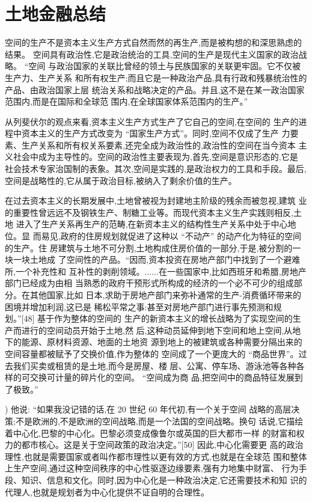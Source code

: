 \chapter{土地金融总结}

空间的生产不是资本主义生产方式自然而然的再生产,而是被构想的和深思熟虑的结果。
空间具有政治性,它是政治统治的工具,空间的生产是现代主义国家的政治战略。 “空间
与政治国家的关联比曾经的领土与民族国家的关联更牢固。它不仅被生产力、生产关系
和所有权生产;而且它是一种政治产品,具有行政和残暴统治性的产品、由政治国家上层
统治关系和战略决定的产品。并且,这不是在某一政治国家范围内,而是在国际和全球范
围内,在全球国家体系范围内的生产。”

从列斐伏尔的观点来看,资本主义生产方式生产了它自己的空间,在空间的
生产的进程中资本主义的生产方式改变为 “国家生产方式”。同时,空间不仅成了生产
力要素、生产关系和所有权关系要素,还完全成为政治性的,政治性的空间在当今资本
主义社会中成为主导性的。空间的政治性主要表现为,首先,空间是意识形态的,它是
社会技术专家治国制的表象。其次,空间是实践的,是政治权力的工具和手段。最后,
空间是战略性的,它从属于政治目标,被纳入了剩余价值的生产。

在过去资本主义的长期发展中,土地曾被视为封建地主阶级的残余而被忽视,建筑
业的重要性曾远远不及钢铁生产、制糖工业等。而现代资本主义生产实践则相反,土地
进入了生产关系再生产的范畴,在新资本主义的结构性生产关系中处于中心地位。显
而易见,政府的住房规划就促进了这种以 “不动产” 的动产化为特征的空间的生产。住
房建筑与土地不可分割,土地构成住房价值的一部分,于是,被分割的一块一块土地成
了空间性的产品。“因而,资本投资在房地产部门中找到了一个避难所,一个补充性和
互补性的剥削领域。......在一些国家中,比如西班牙和希腊,房地产部门已经成为由相
当熟悉的政府干预形式所构成的经济的一个必不可少的组成部分。在其他国家,比如
日本,求助于房地产部门来弥补通常的生产-消费循环带来的困境并增加利润,这已是
稀松平常之事:甚至对房地产部门进行事先预测和规划。”[48] 基于作为整体的空间的
生产的新资本主义的增长战略为了实现空间的生产而进行的空间动员开始于土地,然
后,这种动员延伸到地下空间和地上空间,从地下的能源、原材料资源、地面的土地资
源到地上的被建筑或各种需要分隔出来的空间容量都被赋予了交换价值,作为整体的
空间成了一个更庞大的 “商品世界”。过去我们买卖或租赁的是土地,而今是房屋、楼
层、公寓、停车场、游泳池等各种各样的可交换可计量的碎片化的空间。 “空间成为商
品,把空间中的商品特征发展到了极致。”

)
他说: “如果我没记错的话,在 20 世纪 60 年代初,有一个关于空间
战略的高层决策;不是欧洲的,不是欧洲的空间战略,而是一个法国的空间战略。换句
话说,它描绘着中心化,巴黎的中心化。巴黎必须变成像鲁尔或英国的巨大都市一样
的财富和权力的都市核心。这是关于空间政策的政治决定。”[50] 因此,中心化需要更
高的政治理性,也就是需要国家或者叫作都市理性以更有效的方式,也就是在全球范
围和整体上生产空间,通过这种空间秩序的中心性驱逐边缘要素,强有力地集中财富、
行为手段、知识、信息和文化。同时,因为中心化是一种政治决定,它还需要技术和知
识的代理人,也就是规划者为中心化提供不证自明的合理性。

